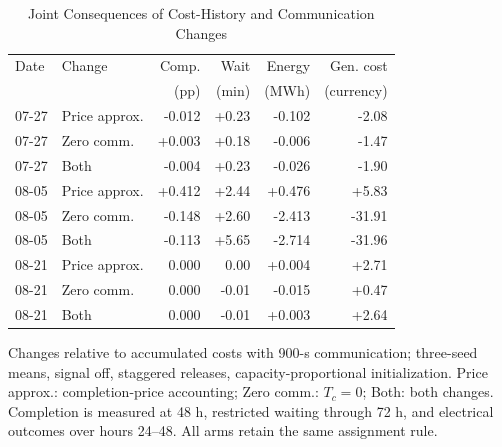 \begin{table}[!htb]
\caption{Joint Consequences of Cost-History and Communication Changes}
\label{tab:same-rule-mechanisms}
\centering\footnotesize
\setlength{\tabcolsep}{2.5pt}
\begin{tabular*}{\columnwidth}{@{\extracolsep{\fill}}llrrrr@{}}
\toprule
Date & Change & Comp. & Wait & Energy & Gen. cost\\
 & & (pp) & (min) & (MWh) & (currency)\\
\midrule
07-27 & Price approx. & -0.012 & +0.23 & -0.102 & -2.08\\
07-27 & Zero comm. & +0.003 & +0.18 & -0.006 & -1.47\\
07-27 & Both & -0.004 & +0.23 & -0.026 & -1.90\\
08-05 & Price approx. & +0.412 & +2.44 & +0.476 & +5.83\\
08-05 & Zero comm. & -0.148 & +2.60 & -2.413 & -31.91\\
08-05 & Both & -0.113 & +5.65 & -2.714 & -31.96\\
08-21 & Price approx. & 0.000 & 0.00 & +0.004 & +2.71\\
08-21 & Zero comm. & 0.000 & -0.01 & -0.015 & +0.47\\
08-21 & Both & 0.000 & -0.01 & +0.003 & +2.64\\
\bottomrule
\end{tabular*}
\vspace{3pt}
\parbox{\columnwidth}{Changes relative to accumulated costs with 900-s communication; three-seed means, signal off, staggered releases, capacity-proportional initialization. Price approx.: completion-price accounting; Zero comm.: $T_c=0$; Both: both changes. Completion is measured at 48 h, restricted waiting through 72 h, and electrical outcomes over hours 24--48. All arms retain the same assignment rule.}
\end{table}
